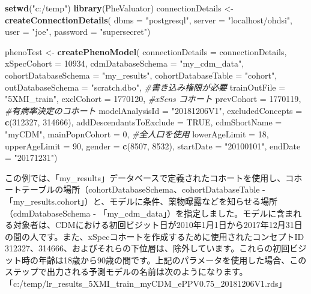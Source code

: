 \documentclass[
  11pt]{book}
\newenvironment{Shaded}{\begin{snugshade}}{\end{snugshade}}
\newcommand{\AttributeTok}[1]{\textcolor[rgb]{0.13,0.29,0.53}{#1}}
\newcommand{\CommentTok}[1]{\textcolor[rgb]{0.56,0.35,0.01}{\textit{#1}}}
\newcommand{\ConstantTok}[1]{\textcolor[rgb]{0.56,0.35,0.01}{#1}}
\newcommand{\DecValTok}[1]{\textcolor[rgb]{0.00,0.00,0.81}{#1}}
\newcommand{\FunctionTok}[1]{\textcolor[rgb]{0.13,0.29,0.53}{\textbf{#1}}}
\newcommand{\NormalTok}[1]{#1}
\newcommand{\OtherTok}[1]{\textcolor[rgb]{0.56,0.35,0.01}{#1}}
\newcommand{\StringTok}[1]{\textcolor[rgb]{0.31,0.60,0.02}{#1}}
\theoremstyle{definition}
\theoremstyle{definition}
\theoremstyle{definition}
\theoremstyle{definition}
\theoremstyle{remark}
\begin{document}
\begin{Shaded}
\begin{Highlighting}[]
\FunctionTok{setwd}\NormalTok{(}\StringTok{"c:/temp"}\NormalTok{)}
\FunctionTok{library}\NormalTok{(PheValuator)}
\NormalTok{connectionDetails }\OtherTok{\textless{}{-}} \FunctionTok{createConnectionDetails}\NormalTok{(}
  \AttributeTok{dbms =} \StringTok{"postgresql"}\NormalTok{,}
  \AttributeTok{server =} \StringTok{"localhost/ohdsi"}\NormalTok{,}
  \AttributeTok{user =} \StringTok{"joe"}\NormalTok{,}
  \AttributeTok{password =} \StringTok{"supersecret"}\NormalTok{)}

\NormalTok{phenoTest }\OtherTok{\textless{}{-}} \FunctionTok{createPhenoModel}\NormalTok{(}
  \AttributeTok{connectionDetails =}\NormalTok{ connectionDetails,}
  \AttributeTok{xSpecCohort =} \DecValTok{10934}\NormalTok{,}
  \AttributeTok{cdmDatabaseSchema =} \StringTok{"my\_cdm\_data"}\NormalTok{,}
  \AttributeTok{cohortDatabaseSchema =} \StringTok{"my\_results"}\NormalTok{,}
  \AttributeTok{cohortDatabaseTable =} \StringTok{"cohort"}\NormalTok{,}
  \AttributeTok{outDatabaseSchema =} \StringTok{"scratch.dbo"}\NormalTok{, }\CommentTok{\#書き込み権限が必要}
  \AttributeTok{trainOutFile =} \StringTok{"5XMI\_train"}\NormalTok{,}
  \AttributeTok{exclCohort =} \DecValTok{1770120}\NormalTok{, }\CommentTok{\#xSens コホート}
  \AttributeTok{prevCohort =} \DecValTok{1770119}\NormalTok{, }\CommentTok{\#有病率決定のコホート}
  \AttributeTok{modelAnalysisId =} \StringTok{"20181206V1"}\NormalTok{,}
  \AttributeTok{excludedConcepts =} \FunctionTok{c}\NormalTok{(}\DecValTok{312327}\NormalTok{, }\DecValTok{314666}\NormalTok{),}
  \AttributeTok{addDescendantsToExclude =} \ConstantTok{TRUE}\NormalTok{,}
  \AttributeTok{cdmShortName =} \StringTok{"myCDM"}\NormalTok{,}
  \AttributeTok{mainPopnCohort =} \DecValTok{0}\NormalTok{, }\CommentTok{\#全人口を使用}
  \AttributeTok{lowerAgeLimit =} \DecValTok{18}\NormalTok{,}
  \AttributeTok{upperAgeLimit =} \DecValTok{90}\NormalTok{,}
  \AttributeTok{gender =} \FunctionTok{c}\NormalTok{(}\DecValTok{8507}\NormalTok{, }\DecValTok{8532}\NormalTok{),}
  \AttributeTok{startDate =} \StringTok{"20100101"}\NormalTok{,}
  \AttributeTok{endDate =} \StringTok{"20171231"}\NormalTok{)}
\end{Highlighting}
\end{Shaded}

この例では、「my\_results」データベースで定義されたコホートを使用し、コホートテーブルの場所（cohortDatabaseSchema、cohortDatabaseTable - 「my\_results.cohort」）と、モデルに条件、薬物曝露などを知らせる場所（cdmDatabaseSchema - 「my\_cdm\_data」）を指定しました。モデルに含まれる対象者は、CDMにおける初回ビジット日が2010年1月1日から2017年12月31日の間の人です。また、xSpecコホートを作成するために使用されたコンセプトID 312327、314666、およびそれらの下位層は、除外しています。これらの初回ビジット時の年齢は18歳から90歳の間です。上記のパラメータを使用した場合、このステップで出力される予測モデルの名前は次のようになります。「c:/temp/lr\_results\_5XMI\_train\_myCDM\_ePPV0.75\_20181206V1.rds」
\end{document}
